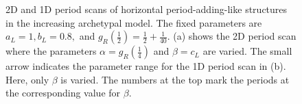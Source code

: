 \begin{figure}
	\centering
	\caption[2D and 1D period scans of horizontal period-adding-like structures in the increasing archetypal model]{
		2D and 1D period scans of horizontal period-adding-like structures in the increasing archetypal model.
		The fixed parameters are $a_L = 1, b_L = 0.8,$ and $g_R\left(\frac{1}{2}\right) = \frac{1}{2} + \frac{1}{40}$.
		(a) shows the 2D period scan where the parameters $\alpha = g_R\left(\frac{1}{4}\right)$ and $\beta = c_L$ are varied.
		The small arrow indicates the parameter range for the 1D period scan in (b).
		Here, only $\beta$ is varied.
		The numbers at the top mark the periods at the corresponding value for $\beta$.
	}
	\label{fig:add.add.like.hor}
\end{figure}

